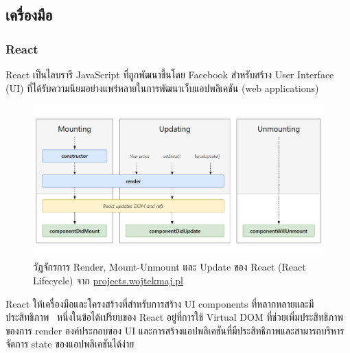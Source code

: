 \documentclass[12pt,oneside,openright,a4paper]{cpe-thai-project}
\begin{document}
    \subsection{เครื่องมือ}
        \subsubsection{React}
            \begin{flushleft}
                React เป็นไลบรารี JavaScript ที่ถูกพัฒนาขึ้นโดย Facebook สำหรับสร้าง User Interface (UI) ที่ได้รับความนิยมอย่างแพร่หลายในการพัฒนาเว็บแอปพลิเคชัน (web applications)~\cite{flanagan20js}
            \end{flushleft}
            \begin{figure}[H]
                \centering
                \includegraphics[width=12cm]{figure/literature/react-lifecycle.png}
                \caption[วัฏจักรการทำงานของ React]{วัฎจักรการ Render, Mount-Unmount และ Update ของ React (React Lifecycle) จาก \href{https://projects.wojtekmaj.pl/react-lifecycle-methods-diagram/}{projects.wojtekmaj.pl} }\label{fig:lit-react}
            \end{figure}
            \begin{flushleft}
                React ให้เครื่องมือและโครงสร้างที่สำหรับการสร้าง UI components ที่หลากหลายและมีประสิทธิภาพ~\cite{crockford08js} หนึ่งในข้อได้เปรียบของ React อยู่ที่การใช้ Virtual DOM ที่ช่วยเพิ่มประสิทธิภาพของการ render องค์ประกอบของ UI และการสร้างแอปพลิเคชันที่มีประสิทธิภาพและสามารถบริหารจัดการ state ของแอปพลิเคชันได้ง่าย~\cite{flanagan20js}
            \end{flushleft}
\end{document}
